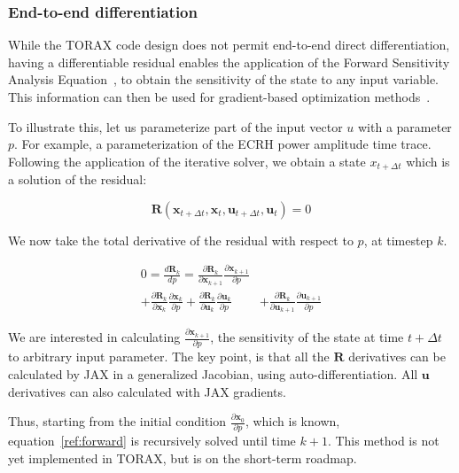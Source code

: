 \documentclass[aps, reprint, nofootinbib]{revtex4-2}
\begin{document}

\subsubsection{End-to-end differentiation}
\label{sec:sensitivity}
While the TORAX code design does not permit end-to-end direct differentiation, having a differentiable residual enables the application of the Forward Sensitivity Analysis Equation~\cite{cacuci:1981, felici:2011}, to obtain the sensitivity of the state to any input variable. This information can then be used for gradient-based optimization methods~\cite{felici:2012}.

To illustrate this, let us parameterize part of the input vector $u$ with a parameter $p$. For example, a parameterization of the ECRH power amplitude time trace. Following the application of the iterative solver, we obtain a state $x_{t+\Delta t}$ which is a solution of the residual:

\begin{equation}
\label{eq:residual}
\mathbf{R}(\mathbf{x}_{t+\Delta t},\mathbf{x}_t,\mathbf{u}_{t+\Delta t},\mathbf{u}_t) = 0
\end{equation}

We now take the total derivative of the residual with respect to $p$, at timestep $k$.

\begin{equation}
\label{ref:forward}
\begin{aligned}
0 = \frac{d \mathbf{R}_k}{d p} = \frac{\partial \mathbf{R}_k}{\partial \mathbf{x}_{k+1}} \frac{\partial \mathbf{x}_{k+1}}{\partial p} \\ + \frac{\partial \mathbf{R}_k}{\partial \mathbf{x}_k} \frac{\partial \mathbf{x}_k}{\partial p} +  \frac{\partial \mathbf{R}_k}{\partial \mathbf{u}_k} \frac{\partial \mathbf{u}_k}{\partial p} & + \frac{\partial \mathbf{R}_k}{\partial \mathbf{u}_{k+1}} \frac{\partial \mathbf{u}_{k+1}}{\partial p}
\end{aligned}
\end{equation}

We are interested in calculating $\frac{\partial \mathbf{x}_{k+1}}{\partial p}$, the sensitivity of the state at time $t+\Delta t$ to arbitrary input parameter. The key point, is that all the $\mathbf{R}$ derivatives can be calculated by JAX in a generalized Jacobian, using auto-differentiation. All $\mathbf{u}$ derivatives can also calculated with JAX gradients. 

Thus, starting from the initial condition $\frac{\partial \mathbf{x}_{0}}{\partial p}$, which is known, equation~\ref{ref:forward} is recursively solved until time $k+1$. This method is not yet implemented in TORAX, but is on the short-term roadmap.
\end{document}
